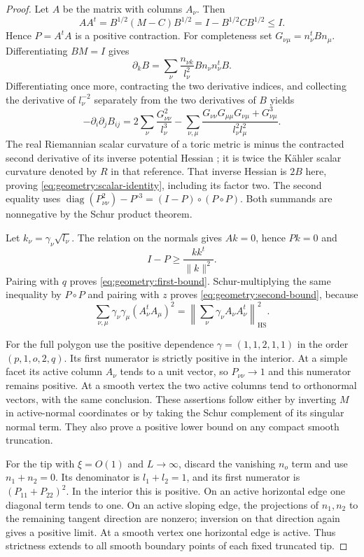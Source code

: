 \begin{proof}
Let $A$ be the matrix with columns $A_\nu$.  Then
\[
 AA^t=B^{1/2}(M-C)B^{1/2}
       =I-B^{1/2}CB^{1/2}\le I.
\]
Hence $P=A^tA$ is a positive contraction.  For completeness set
$G_{\nu\mu}=n_\nu^tBn_\mu$.  Differentiating
$B M=I$ gives
\[
 \partial_kB
   =\sum_\nu \frac{n_{\nu k}}{l_\nu^2}
                     Bn_\nu n_\nu^tB.
\]
Differentiating once more, contracting the two derivative indices,
and collecting the derivative of $l_\nu^{-2}$ separately from the
two derivatives of $B$ yields
\[
 -\partial_i\partial_jB_{ij}
 =2\sum_\nu\frac{G_{\nu\nu}^2}{l_\nu^3}
 -\sum_{\nu,\mu}
   \frac{G_{\nu\nu}G_{\mu\mu}G_{\nu\mu}+G_{\nu\mu}^3}
        {l_\nu^2l_\mu^2}.
\]
The real Riemannian scalar curvature of a toric metric is minus the
contracted second derivative of its inverse potential Hessian
\cite[Theorem~4.1(i), arXiv version~1]{Abreu1998}; it is twice the K\"ahler scalar
curvature denoted by $R$ in that reference.
That inverse Hessian is $2B$ here, proving
\eqref{eq:geometry:scalar-identity}, including its factor two.  The
second equality uses
$\operatorname{diag}(P_{\nu\nu}^2)-P^{\circ3}
=(I-P)\circ(P\circ P)$.  Both summands are nonnegative by the
Schur product theorem.

Let $k_\nu=\gamma_\nu\sqrt{l_\nu}$.  The relation on the normals
gives $Ak=0$, hence $Pk=0$ and
\[
 I-P\ge \frac{kk^t}{\|k\|^2}.
\]
Pairing with $q$ proves \eqref{eq:geometry:first-bound}.
Schur-multiplying the same inequality by $P\circ P$ and pairing
with $z$ proves \eqref{eq:geometry:second-bound}, because
\[
 \sum_{\nu,\mu}\gamma_\nu\gamma_\mu
                 (A_\nu^tA_\mu)^2
 =\left\|\sum_\nu\gamma_\nu A_\nu A_\nu^t\right\|_{\mathrm{HS}}^2.
\]

For the full polygon use the positive dependence
$\gamma=(1,1,2,1,1)$ in the order $(p,1,o,2,q)$.
Its first numerator is strictly positive in the interior.  At a
simple facet its active column $A_\nu$ tends to a unit vector, so
$P_{\nu\nu}\to1$ and this numerator remains positive.  At a smooth
vertex the two active columns tend to orthonormal vectors, with the
same conclusion.  These assertions follow either by inverting $M$
in active-normal coordinates or by taking the Schur complement of
its singular normal term.  They also prove a positive lower bound
on any compact smooth truncation.

For the tip with $\xi=O(1)$ and $L\to\infty$, discard the vanishing
$n_o$ term and use $n_1+n_2=0$.  Its denominator is
$l_1+l_2=1$, and its first numerator is
$(P_{11}+P_{22})^2$.  In the interior this is positive.  On an
active horizontal edge one diagonal term tends to one.  On an
active sloping edge, the projections of $n_1,n_2$ to the remaining
tangent direction are nonzero; inversion on that direction again
gives a positive limit.  At a smooth vertex one horizontal edge is
active.  Thus strictness extends to all smooth boundary points of
each fixed truncated tip.


\end{proof}
